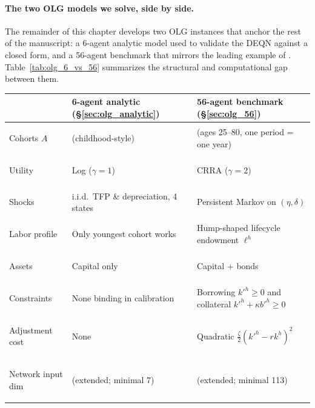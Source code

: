 \documentclass[11pt,a4paper]{report}
\begin{document}
\paragraph{The two OLG models we solve, side by side.}
The remainder of this chapter develops two OLG instances that anchor the rest of the manuscript: a 6-agent analytic model used to validate the DEQN against a closed form, and a 56-agent benchmark that mirrors the leading example of \citet{azinovicDEEPEQUILIBRIUMNETS2022}.  Table~\ref{tab:olg_6_vs_56} summarizes the structural and computational gap between them.

\begin{table}[ht]
\centering
\footnotesize
\setlength{\tabcolsep}{4pt}
\renewcommand{\arraystretch}{1.25}
\begin{tabular}{@{}>{\bfseries\raggedright\arraybackslash}p{2.8cm} >{\raggedright\arraybackslash}p{4.7cm} >{\raggedright\arraybackslash}p{7.2cm}@{}}
\toprule
                              & \textbf{6-agent analytic (\S\ref{sec:olg_analytic})}    & \textbf{56-agent benchmark (\S\ref{sec:olg_56})} \\
\midrule
Cohorts $A$                   & 6 (childhood-style)                                     & 56 (ages 25--80, one period = one year)         \\
Utility                       & Log ($\gamma=1$)                                        & CRRA ($\gamma=2$)                               \\
Shocks                        & i.i.d.\ TFP \& depreciation, 4 states                   & Persistent Markov on $(\eta,\delta)$            \\
Labor profile                 & Only youngest cohort works                              & Hump-shaped lifecycle endowment $\ell^h$        \\
Assets                        & Capital only                                            & Capital $+$ bonds                               \\
Constraints                   & None binding in calibration                             & Borrowing $k'^h\!\ge\!0$ and collateral $k'^h\!+\!\kappa b'^h\!\ge\!0$ \\
Adjustment cost               & None                                                    & Quadratic $\tfrac{\zeta}{2}(k'^h\!-\!rk^h)^2$   \\
Network input dim             & 32 (extended; minimal 7)                                & 236 (extended; minimal 113)                     \\

\end{tabular}
\end{table}
\end{document}

